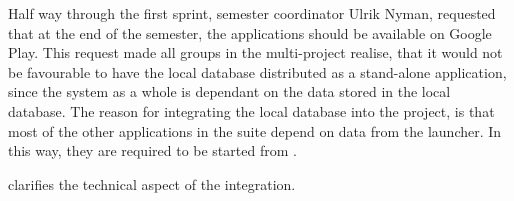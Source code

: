 Half way through the first sprint, semester coordinator Ulrik Nyman, requested that at the end of the semester, the applications should be available on Google Play.
This request made all groups in the multi-project realise, that it would not be favourable to have the local database distributed as a stand-alone application, since the \giraf system as a whole is dependant on the data stored in the local database.
The reason for integrating the local database into the \launcher project, is that most of the other applications in the \giraf suite depend on data from the launcher.
In this way, they are required to be started from \launcher.

 clarifies the technical aspect of the integration.